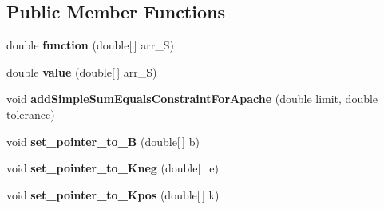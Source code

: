 \subsection*{Public Member Functions}
\begin{DoxyCompactItemize}
\item 
\hypertarget{classuk_1_1ac_1_1dmu_1_1iesd_1_1cascade_1_1util_1_1_minimisation_function_objective_flat_demand_a1d69ce24230e1a797a44a734e6719537}{double {\bfseries function} (double\mbox{[}$\,$\mbox{]} arr\-\_\-\-S)}\label{classuk_1_1ac_1_1dmu_1_1iesd_1_1cascade_1_1util_1_1_minimisation_function_objective_flat_demand_a1d69ce24230e1a797a44a734e6719537}

\item 
\hypertarget{classuk_1_1ac_1_1dmu_1_1iesd_1_1cascade_1_1util_1_1_minimisation_function_objective_flat_demand_ac519f0d0c4bf606524bdda5c2f54ec0f}{double {\bfseries value} (double\mbox{[}$\,$\mbox{]} arr\-\_\-\-S)}\label{classuk_1_1ac_1_1dmu_1_1iesd_1_1cascade_1_1util_1_1_minimisation_function_objective_flat_demand_ac519f0d0c4bf606524bdda5c2f54ec0f}

\item 
\hypertarget{classuk_1_1ac_1_1dmu_1_1iesd_1_1cascade_1_1util_1_1_minimisation_function_objective_flat_demand_a254b286b729e8c728a8cdd070b4dc9f0}{void {\bfseries add\-Simple\-Sum\-Equals\-Constraint\-For\-Apache} (double limit, double tolerance)}\label{classuk_1_1ac_1_1dmu_1_1iesd_1_1cascade_1_1util_1_1_minimisation_function_objective_flat_demand_a254b286b729e8c728a8cdd070b4dc9f0}

\item 
\hypertarget{classuk_1_1ac_1_1dmu_1_1iesd_1_1cascade_1_1util_1_1_minimisation_function_objective_flat_demand_ac9cdcd8923daa2c6161bb87923511a5a}{void {\bfseries set\-\_\-pointer\-\_\-to\-\_\-\-B} (double\mbox{[}$\,$\mbox{]} b)}\label{classuk_1_1ac_1_1dmu_1_1iesd_1_1cascade_1_1util_1_1_minimisation_function_objective_flat_demand_ac9cdcd8923daa2c6161bb87923511a5a}

\item 
\hypertarget{classuk_1_1ac_1_1dmu_1_1iesd_1_1cascade_1_1util_1_1_minimisation_function_objective_flat_demand_af1a0c4321e209d58ddd025877ca6c7eb}{void {\bfseries set\-\_\-pointer\-\_\-to\-\_\-\-Kneg} (double\mbox{[}$\,$\mbox{]} e)}\label{classuk_1_1ac_1_1dmu_1_1iesd_1_1cascade_1_1util_1_1_minimisation_function_objective_flat_demand_af1a0c4321e209d58ddd025877ca6c7eb}

\item 
\hypertarget{classuk_1_1ac_1_1dmu_1_1iesd_1_1cascade_1_1util_1_1_minimisation_function_objective_flat_demand_ac61b634e961b3c4c059cd7456815dec8}{void {\bfseries set\-\_\-pointer\-\_\-to\-\_\-\-Kpos} (double\mbox{[}$\,$\mbox{]} k)}\label{classuk_1_1ac_1_1dmu_1_1iesd_1_1cascade_1_1util_1_1_minimisation_function_objective_flat_demand_ac61b634e961b3c4c059cd7456815dec8}


\end{DoxyCompactItemize}
